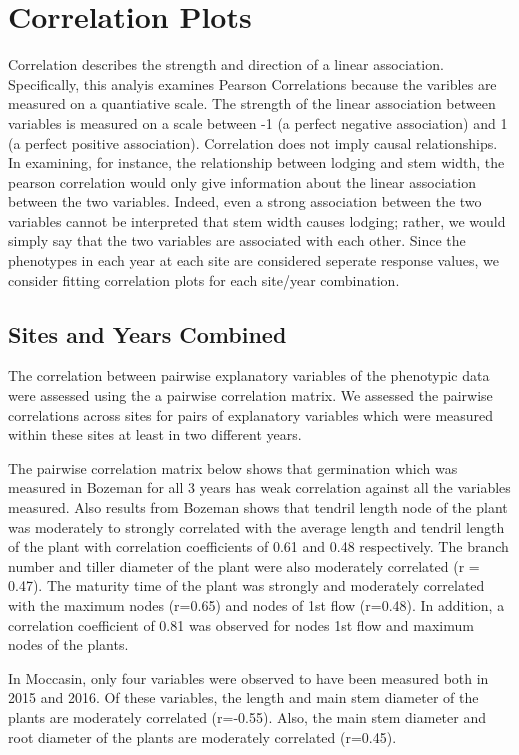 \documentclass[11pt]{article}\usepackage[]{graphicx}\usepackage[]{color}
\begin{document}
\section{Correlation Plots}
Correlation describes the strength and direction of a linear association. Specifically, this analyis examines Pearson Correlations because the varibles are measured on a quantiative scale.  The strength of the linear association between variables is measured on a scale between -1 (a perfect negative association) and 1 (a perfect positive association). Correlation does not imply causal relationships. In examining, for instance, the relationship between lodging and stem width, the pearson correlation would only give information about the linear association between the two variables.  Indeed, even a strong association between the two variables cannot be interpreted that stem width causes lodging; rather, we would simply say that the two variables are associated with each other.  Since the phenotypes in each year at each site are considered seperate response values, we consider fitting correlation plots for each site/year combination. 

\subsection{Sites and Years Combined}

The correlation between pairwise explanatory variables of the phenotypic data were assessed using the a pairwise correlation matrix. We assessed the pairwise correlations across sites for pairs of explanatory variables which were measured within these sites at least in two different years.

The pairwise correlation matrix below shows that germination which was measured in Bozeman for all 3 years has weak correlation against all the variables measured. Also results from Bozeman shows that tendril length node of the plant was moderately to strongly correlated with the average length and tendril length of the plant with correlation coefficients of 0.61 and 0.48 respectively. The branch number and tiller diameter of the plant were also moderately correlated (r = 0.47). The maturity time of the plant was strongly and moderately correlated with the maximum nodes (r=0.65) and nodes of 1st flow (r=0.48). In addition, a correlation coefficient of 0.81 was observed for nodes 1st flow and maximum nodes of the plants.

In Moccasin, only four variables were observed to have been measured both in 2015 and 2016. Of these variables, the length and main stem diameter of the plants are moderately correlated (r=-0.55). Also, the main stem diameter and root diameter of the plants are moderately correlated (r=0.45).
\end{document}
